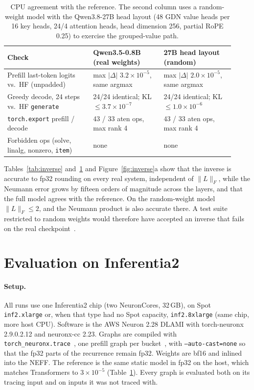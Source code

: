 \documentclass[11pt]{article}
\theoremstyle{remark}
\begin{document}
\begin{table}[t]
\centering\small
\begin{tabular}{p{0.34\linewidth}p{0.29\linewidth}p{0.29\linewidth}}
\toprule
Check & Qwen3.5-0.8B (real weights) & 27B head layout (random) \\
\midrule
Prefill last-token logits vs.\ HF (unpadded) & max $|\Delta|$ $3.2\times10^{-5}$, same argmax & max $|\Delta|$ $2.0\times10^{-5}$, same argmax \\
Greedy decode, 24 steps vs.\ HF \texttt{generate} & 24/24 identical; KL $\le3.7\times10^{-7}$ & 24/24 identical; KL $\le1.0\times10^{-6}$ \\
\texttt{torch.export} prefill / decode & 43 / 33 aten ops, max rank 4 & 43 / 33 aten ops, max rank 4 \\
Forbidden ops (solve, linalg, nonzero, \texttt{item}) & none & none \\
\bottomrule
\end{tabular}
\caption{CPU agreement with the reference. The second column uses a random-weight model with the Qwen3.8-27B head layout (48
GDN value heads per 16 key heads, 24/4 attention heads, head dimension 256, partial RoPE 0.25) to exercise the grouped-value
path.}
\label{tab:e2e}
\end{table}

Tables~\ref{tab:inverse} and~\ref{tab:e2e} and Figure~\ref{fig:inverse}a show that the inverse is accurate to fp32 rounding
on every real system, independent of $\lVert L\rVert_F$, while the Neumann error grows by fifteen orders of magnitude across
the layers, and that the full model agrees with the reference. On the random-weight model $\lVert L\rVert_F\le2$, and the Neumann product is also
accurate there. A test suite restricted to random weights would therefore have accepted an inverse that fails on the real
checkpoint~\cite{jburtoft}.

\section{Evaluation on Inferentia2}\label{sec:device}
\paragraph{Setup.} All runs use one Inferentia2 chip (two NeuronCores, 32\,GB), on Spot \texttt{inf2.xlarge} or, when that
type had no Spot capacity, \texttt{inf2.8xlarge} (same chip, more host CPU). Software is the AWS Neuron 2.28 DLAMI with
torch-neuronx 2.9.0.2.12 and neuronx-cc 2.23. Graphs are compiled with \texttt{torch\_neuronx.trace}~\cite{neurontrace}, one
prefill graph per bucket~\cite{nxdibucketing}, with \texttt{--auto-cast=none} so that the fp32 parts of the recurrence remain
fp32. Weights are bf16 and inlined into the NEFF. The reference is the same static model in fp32 on the host, which matches
Transformers to $3\times10^{-5}$ (Table~\ref{tab:e2e}). Every graph is evaluated both on its tracing input and on inputs it
was not traced with.
\end{document}
